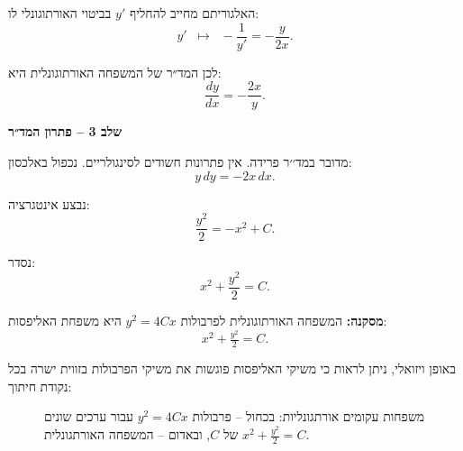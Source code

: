 \documentclass{article}
\numberwithin{equation}{section}
\begin{document}
האלגוריתם מחייב להחליף $y'$ בביטוי האורתוגונלי לו:
\[
y' \;\;\longmapsto\;\; -\frac{1}{y'} = -\frac{y}{2x}.
\]

לכן המד״ר של המשפחה האורתוגונלית היא:
\[
\frac{dy}{dx} = -\frac{2x}{y}.
\]

\textbf{שלב 3 – פתרון המד״ר}  

מדובר במד׳׳ר פרידה. אין פתרונות חשודים לסינגולריים.
נכפול באלכסון:
\[
y\,dy = -2x\,dx.
\]

נבצע אינטגרציה:
\[
\frac{y^2}{2} = -x^2 + C.
\]

נסדר:
\[
x^2 + \frac{y^2}{2} = C.
\]

\textbf{מסקנה:}  
המשפחה האורתוגונלית לפרבולות $y^2=4Cx$ היא משפחת האליפסות:
\[
\boxed{x^2 + \tfrac{y^2}{2} = C}.
\]

באופן ויזואלי, ניתן לראות כי משיקי האליפסות פוגשות את משיקי הפרבולות בזווית ישרה בכל נקודת חיתוך:  

\begin{figure}[H]
\centering
{}
\caption{משפחות עקומים אורתגונליות: בכחול – פרבולות $y^2=4Cx$ עבור ערכים שונים של $C$, ובאדום – המשפחה האורתגונלית $x^2+\tfrac{y^2}{2}=C$.}
\label{fig:parabola_orthogonal}
\end{figure}
\end{document}
